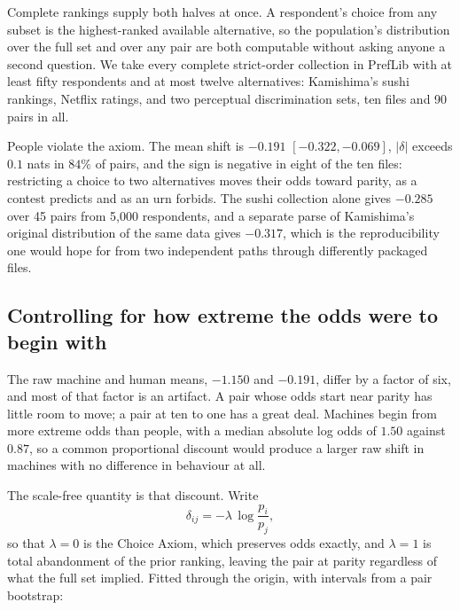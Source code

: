 \documentclass[11pt]{article}
\begin{document}
Complete rankings supply both halves at once. A respondent's choice from any
subset is the highest-ranked available alternative, so the population's
distribution over the full set and over any pair are both computable without
asking anyone a second question. We take every complete strict-order collection
in PrefLib with at least fifty respondents and at most twelve alternatives:
Kamishima's sushi rankings, Netflix ratings, and two perceptual discrimination
sets, ten files and 90 pairs in all.

People violate the axiom. The mean shift is $-0.191$ $[-0.322, -0.069]$,
$\lvert\delta\rvert$ exceeds $0.1$ nats in $84\%$ of pairs, and the sign is
negative in eight of the ten files: restricting a choice to two alternatives
moves their odds toward parity, as a contest predicts and as an urn forbids. The
sushi collection alone gives $-0.285$ over 45 pairs from 5{,}000 respondents,
and a separate parse of Kamishima's original distribution of the same data gives
$-0.317$, which is the reproducibility one would hope for from two independent
paths through differently packaged files.

\subsection{Controlling for how extreme the odds were to begin with}

The raw machine and human means, $-1.150$ and $-0.191$, differ by a factor of
six, and most of that factor is an artifact. A pair whose odds start near parity
has little room to move; a pair at ten to one has a great deal. Machines begin
from more extreme odds than people, with a median absolute log odds of $1.50$
against $0.87$, so a common proportional discount would produce a larger raw
shift in machines with no difference in behaviour at all.

The scale-free quantity is that discount. Write
\begin{equation}
\delta_{ij} = -\lambda \, \log\frac{p_i}{p_j},
\label{eq:lambda}
\end{equation}
so that $\lambda = 0$ is the Choice Axiom, which preserves odds exactly, and
$\lambda = 1$ is total abandonment of the prior ranking, leaving the pair at
parity regardless of what the full set implied. Fitted through the origin, with
intervals from a pair bootstrap:
\end{document}
